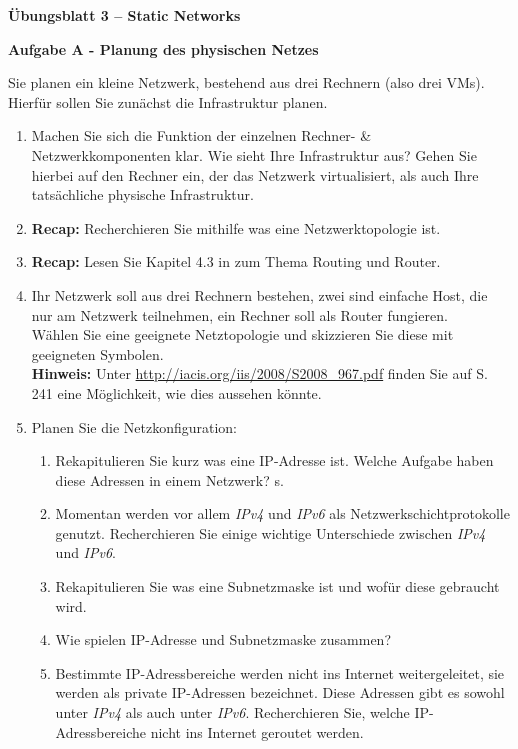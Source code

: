 \documentclass[paper=a4,fontsize=11pt]{scrartcl}%
\numberwithin{equation}{section}
\begin{document}
\begin{center}
\Large{\textbf{Übungsblatt 3 -- Static Networks}}
\end{center}

\begin{center}\Large{\textbf{Aufgabe A - Planung des physischen Netzes}}\end{center}

Sie planen ein kleine Netzwerk, bestehend aus drei Rechnern (also drei VMs). Hierfür sollen Sie zunächst die Infrastruktur planen.
\begin{enumerate}
	\item Machen Sie sich die Funktion der einzelnen Rechner- \& Netzwerkkomponenten klar. Wie sieht Ihre Infrastruktur aus? Gehen Sie hierbei auf den Rechner ein, der das Netzwerk virtualisiert, als auch Ihre tatsächliche physische Infrastruktur.
	\item \textbf{Recap:} Recherchieren Sie mithilfe \cite[S. 461ff]{Kurose2012}  was eine Netzwerktopologie ist.
	\item \textbf{Recap:} Lesen Sie Kapitel 4.3 in \cite[S. 320ff]{Kurose2012} zum Thema Routing und Router.
	\item Ihr Netzwerk soll aus drei Rechnern bestehen, zwei sind einfache Host, die nur am Netzwerk teilnehmen, ein Rechner soll als Router fungieren.\\
	Wählen Sie eine geeignete Netztopologie und skizzieren Sie diese mit geeigneten Symbolen.\\ 
	\textbf{Hinweis:} Unter \url{http://iacis.org/iis/2008/S2008_967.pdf} finden Sie auf S. 241 eine Möglichkeit, wie dies aussehen könnte.\\
	\item Planen Sie die Netzkonfiguration:
	\begin{enumerate}
		\item Rekapitulieren Sie kurz was eine IP-Adresse ist. Welche Aufgabe haben diese Adressen in einem Netzwerk? s. \cite[S. 331ff]{Kurose2012}
		\item Momentan werden vor allem \emph{IPv4} und \emph{IPv6} als Netzwerkschichtprotokolle genutzt. Recherchieren Sie einige wichtige Unterschiede zwischen \emph{IPv4} und \emph{IPv6}.
		\item Rekapitulieren Sie was eine Subnetzmaske ist und wofür diese gebraucht wird.
		\item Wie spielen IP-Adresse und Subnetzmaske zusammen?
		\item Bestimmte IP-Adressbereiche werden nicht ins Internet weitergeleitet, sie werden als private IP-Adressen bezeichnet. Diese Adressen gibt es sowohl unter \emph{IPv4} als auch unter \emph{IPv6}. Recherchieren Sie, welche IP-Adressbereiche nicht ins Internet geroutet werden.

\end{enumerate}
\end{enumerate}
\end{document}
